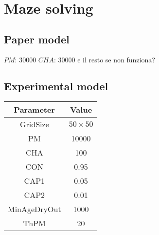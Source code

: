 \section{Maze solving}

\subsection{Paper model}
$PM$: 30000
$CHA$: 30000
e il resto se non funziona?

\subsection{Experimental model}

\begin{center}
 \begin{tabular}{||c c||} 
 \hline
 Parameter & Value \\ [0.5ex] 
 \hline\hline
 GridSize & $50 \times 50$ \\ 
 \hline
 PM & 10000 \\ 
 \hline
 CHA & 100 \\ 
 \hline
 CON & 0.95 \\ 
 \hline
 CAP1 & 0.05 \\ 
 \hline
 CAP2 & 0.01 \\ 
 \hline
 MinAgeDryOut & 1000 \\
 \hline
 ThPM & 20 \\ [1ex] 
 \hline
 \end{tabular}
\end{center}
